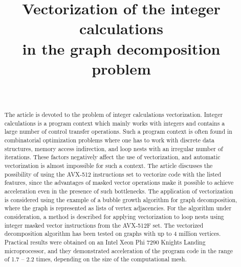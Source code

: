 \documentclass[
11pt,%
tightenlines,%
twoside,%
onecolumn,%
nofloats,%
nobibnotes,%
nofootinbib,%
superscriptaddress,%
noshowpacs,%
centertags]%
{revtex4}
\begin{document}

\title{Vectorization of the integer calculations \\ in the graph decomposition problem}

\author{~}




\begin{abstract} %
The article is devoted to the problem of integer calculations vectorization.
Integer calculations is a program context which mainly works with integers and contains a large number of control transfer operations.
Such a program context is often found in combinatorial optimization problems where one has to work with discrete data structures, memory access indirection, and loop nests with an irregular number of iterations.
These factors negatively affect the use of vectorization, and automatic vectorization is almost impossible for such a context.
The article discusses the possibility of using the AVX-512 instructions set to vectorize code with the listed features, since the advantages of masked vector operations make it possible to achieve acceleration even in the presence of such bottlenecks.
The application of vectorization is considered using the example of a bubble growth algorithm for graph decomposition, where the graph is represented as lists of vertex adjacencies.
For the algorithm under consideration, a method is described for applying vectorization to loop nests using integer masked vector instructions from the AVX-512F set.
The vectorized decomposition algorithm has been tested on graphs with up to 4 million vertices.
Practical results were obtained on an Intel Xeon Phi 7290 Knights Landing microprocessor, and they demonstrated acceleration of the program code in the range of 1.7 -- 2.2 times, depending on the size of the computational mesh.
\end{abstract}
\end{document}

